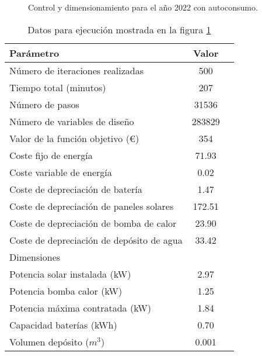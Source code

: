 \begin{figure}[h] \centering
	\centering
	
	\caption{Control y dimensionamiento para el año 2022 con autoconsumo.}
	\label{fig:sizing_regulated_full_year}
\end{figure}

\begin{table}[ht]
	\centering
	\caption{Datos para ejecución mostrada en la figura \ref{fig:sizing_regulated_full_year}}
	\label{tab:sizing_regulated_full_year}
	\begin{tabular}{@{}lcc@{}}
		\toprule
		Parámetro                                 & Valor  \\
		\midrule
		Número de iteraciones realizadas          & 500    \\
		Tiempo total (minutos)                    & 207    \\
		Número de pasos                           & 31536  \\
		Número de variables de diseño             & 283829 \\
		\midrule
		Valor de la función objetivo (€)          & 354    \\
		\midrule
		Coste fijo de energía                     & 71.93  \\
		Coste variable de energía                 & 0.02   \\
		Coste de depreciación de batería          & 1.47   \\
		Coste de depreciación de paneles solares  & 172.51 \\
		Coste de depreciación de bomba de calor   & 23.90  \\
		Coste de depreciación de depósito de agua & 33.42  \\
		\midrule
		Dimensiones                               &        \\
		\midrule
		Potencia solar instalada (kW)             & 2.97   \\
		Potencia bomba calor (kW)                 & 1.25   \\
		Potencia máxima contratada (kW)           & 1.84   \\
		Capacidad baterías (kWh)                  & 0.70   \\
		Volumen depósito ($m^3$)                  & 0.001  \\
		\bottomrule
	\end{tabular}
\end{table}


